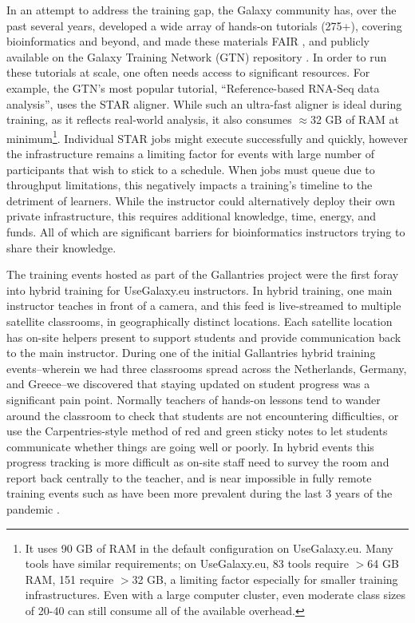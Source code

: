 \documentclass[a4paper,num-refs]{oup-contemporary}
\begin{document}
In an attempt to address the training gap, the Galaxy community has, over the past several years, developed a wide array of hands-on tutorials (275+), covering bioinformatics and beyond, and made these materials FAIR \cite{Wilkinson2016-zo,10.1371/journal.pcbi.1007854}, and publicly available on the Galaxy Training Network (GTN) repository \cite{training-site}. In order to run these tutorials at scale, one often needs access to significant resources. For example, the GTN's most popular tutorial, ``Reference-based RNA-Seq data analysis'', uses the STAR aligner\cite{Dobin2012}. While such an ultra-fast aligner is ideal during training, as it reflects real-world analysis, it also consumes $\approx$32 GB of RAM at minimum\footnote{It uses 90 GB of RAM in the default configuration on UseGalaxy.eu. Many tools have similar requirements; on UseGalaxy.eu, 83 tools require $>$64 GB RAM, 151 require $>$32 GB, a limiting factor especially for smaller training infrastructures. Even with a large computer cluster, even moderate class sizes of 20-40 can still consume all of the available overhead.}. Individual STAR jobs might execute successfully and quickly, however the infrastructure remains a limiting factor for events with large number of participants that wish to stick to a schedule. When jobs must queue due to throughput limitations, this negatively impacts a training's timeline to the detriment of learners. While the instructor could alternatively deploy their own private infrastructure, this requires additional knowledge, time, energy, and funds. All of which are significant barriers for bioinformatics instructors trying to share their knowledge.

The training events hosted as part of the Gallantries project \cite{gallantries} were the first foray into hybrid training for UseGalaxy.eu instructors. In hybrid training, one main instructor teaches in front of a camera, and this feed is live-streamed to multiple satellite classrooms, in geographically distinct locations. Each satellite location has on-site helpers present to support students and provide communication back to the main instructor. During one of the initial Gallantries hybrid training events--wherein we had three classrooms spread across the Netherlands, Germany, and Greece--we discovered that staying updated on student progress was a significant pain point. Normally teachers of hands-on lessons tend to wander around the classroom to check that students are not encountering difficulties, or use the Carpentries-style \cite{thecarpentries,Wilson2016} method of red and green sticky notes to let students communicate whether things are going well or poorly. In hybrid events this progress tracking is more difficult as on-site staff need to survey the room and report back centrally to the teacher, and is near impossible in fully remote training events such as have been more prevalent during the last 3 years of the pandemic \cite{Serrano_Solano_2021}.
\end{document}
